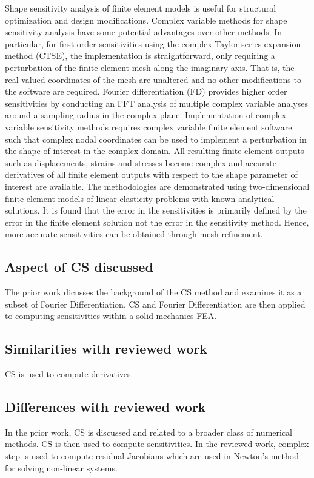 \documentclass[10pt,letterpaper,draft]{article}
\begin{document}
Shape sensitivity analysis of finite element models is useful for structural
optimization and design modifications. Complex variable methods for shape
sensitivity analysis have some potential advantages over other methods. In
particular, for first order sensitivities using the complex Taylor series
expansion method (CTSE), the implementation is straightforward, only requiring
a perturbation of the finite element mesh along the imaginary axis. That is,
the real valued coordinates of the mesh are unaltered and no other
modifications to the software are required. Fourier differentiation (FD)
provides higher order sensitivities by conducting an FFT analysis of multiple
complex variable analyses around a sampling radius in the complex plane.
Implementation of complex variable sensitivity methods requires complex
variable finite element software such that complex nodal coordinates can be
used to implement a perturbation in the shape of interest in the complex
domain. All resulting finite element outputs such as displacements, strains and
stresses become complex and accurate derivatives of all finite element outputs
with respect to the shape parameter of interest are available. The
methodologies are demonstrated using two-dimensional finite element models of
linear elasticity problems with known analytical solutions. It is found that
the error in the sensitivities is primarily defined by the error in the finite
element solution not the error in the sensitivity method. Hence, more accurate
sensitivities can be obtained through mesh refinement.

\subsection{Aspect of CS discussed}
The prior work dicusses the background of the CS method and examines it as a subset
of Fourier Differentiation. CS and Fourier Differentiation are then applied to 
computing sensitivities within a solid mechanics FEA.

\subsection{Similarities with reviewed work}
CS is used to compute derivatives.

\subsection{Differences with reviewed work}
In the prior work, CS is discussed and related to a broader class of numerical methods. CS is then used
to compute sensitivities. In the reviewed work, complex step is used to compute residual Jacobians
which are used in Newton's method for solving non-linear systems.
\end{document}

